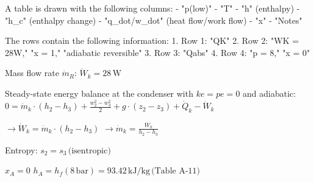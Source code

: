A table is drawn with the following columns:  
- "p(low)"  
- "T"  
- "h" (enthalpy)  
- "h_c" (enthalpy change)  
- "q_dot/w_dot" (heat flow/work flow)  
- "x"  
- "Notes"  

The rows contain the following information:  
1. Row 1: "QK"  
2. Row 2: "WK = 28W," "x = 1," "adiabatic reversible"  
3. Row 3: "Qabs"  
4. Row 4: "p = 8," "x = 0"

Mass flow rate \( \dot{m}_R \):  
\( \dot{W}_k = 28 \, \text{W} \)  

Steady-state energy balance at the condenser with \( ke = pe = 0 \) and adiabatic:  
\( 0 = \dot{m}_k \cdot (h_2 - h_3) + \frac{w_2^2 - w_3^2}{2} + g \cdot (z_2 - z_3) + \dot{Q}_k - \dot{W}_k \)  

\( \rightarrow \dot{W}_k = \dot{m}_k \cdot (h_2 - h_3) \)  
\( \rightarrow \dot{m}_k = \frac{\dot{W}_k}{h_2 - h_3} \)  

Entropy:  
\( s_2 = s_3 \, \text{(isentropic)} \)  

\( x_A = 0 \)  
\( h_A = h_f (8 \, \text{bar}) = 93.42 \, \text{kJ/kg} \, \text{(Table A-11)} \)